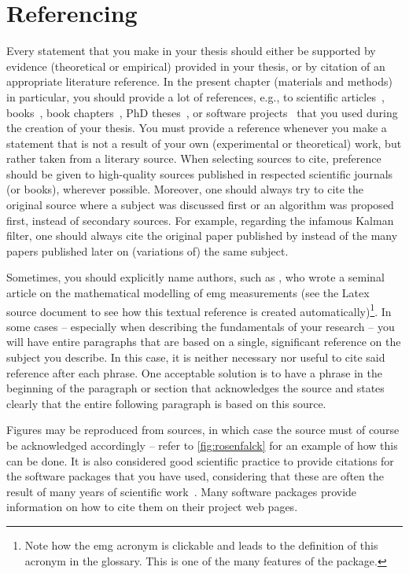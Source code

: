 \section{Referencing}
Every statement that you make in your thesis should either be supported by evidence (theoretical or empirical) provided in your thesis, or by citation of an appropriate literature reference.
In the present chapter (materials and methods) in particular, you should provide a lot of references, e.g., to scientific articles~\cite{farina99}, books~\cite{plonsey07}, book chapters~\cite{rodriguez-falces12}, PhD theses~\cite{fevotte03}, or software projects~\cite{r-project} that you used during the creation of your thesis.
You must provide a reference whenever you make a statement that is not a result of your own (experimental or theoretical) work, but rather taken from a literary source.
When selecting sources to cite, preference should be given to high-quality sources published in respected scientific journals (or books), wherever possible.
Moreover, one should always try to cite the original source where a subject was discussed first or an algorithm was proposed first, instead of secondary sources.
For example, regarding the infamous Kalman filter, one should always cite the original paper published by \textcite{Kalman1960} instead of the many papers published later on (variations of) the same subject.

Sometimes, you should explicitly name authors, such as \textcite{farina99}, who wrote a seminal article on the mathematical modelling of \gls{emg} measurements (see the Latex source document to see how this textual reference is created automatically)\footnote{Note how the \gls{emg} acronym is clickable and leads to the definition of this acronym in the glossary.
This is one of the many features of the  package.}.
In some cases -- especially when describing the fundamentals of your research -- you will have entire paragraphs that are based on a single, significant reference on the subject you describe.
In this case, it is neither necessary nor useful to cite said reference after each phrase.
One acceptable solution is to have a phrase in the beginning of the paragraph or section that acknowledges the source and states clearly that the entire following paragraph is based on this source.

Figures may be reproduced from sources, in which case the source must of course be acknowledged accordingly -- refer to \cref{fig:rosenfalck} for an example of how this can be done.
It is also considered good scientific practice to provide citations for the software packages that you have used, considering that these are often the result of many years of scientific work~\cite{r-project, Wickham2009}.
Many software packages provide information on how to cite them on their project web pages.

